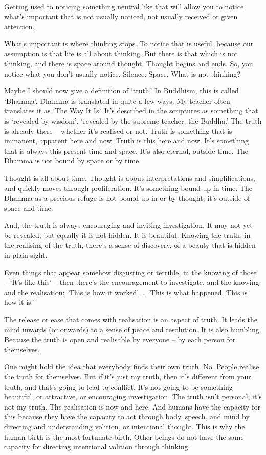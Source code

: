 Getting used to noticing something neutral like that will allow you to notice
what's important that is not usually noticed, not usually received or given
attention.

What's important is where thinking stops. To notice that is useful, because our
assumption is that life is all about thinking. But there is that which is not
thinking, and there is space around thought. Thought begins and ends. So, you
notice what you don't usually notice. Silence. Space. What is not thinking?

Maybe I should now give a definition of `truth.' In Buddhism, this is called
`Dhamma'. Dhamma is translated in quite a few ways. My teacher often translates
it as `The Way It Is'. It's described in the scriptures as something that is
`revealed by wisdom', `revealed by the supreme teacher, the Buddha.' The truth
is already there -- whether it's realised or not. Truth is something that is
immanent, apparent here and now. Truth is this here and now. It's something that is always this
present time and space. It's also eternal, outside time. The Dhamma is not bound by
space or by time.

Thought is all about time. Thought is about interpretations and simplifications,
and quickly moves through proliferation. It's something bound up in time. The
Dhamma as a precious refuge is not bound up in or by thought; it's outside of
space and time.

And, the truth is always encouraging and inviting investigation. It may not
yet be revealed, but equally it is not hidden. It is beautiful. Knowing
the truth, in the realising of the truth, there's a sense of discovery, of a
beauty that is hidden in plain sight.

Even things that appear somehow disgusting or terrible, in the knowing of those
-- `It's like this' -- then there's the encouragement to investigate, and the
knowing and the realisation: `This is how it worked' \ldots{} `This is what
happened. This is how it is.'

The release or ease that comes with realisation is an aspect of truth. It leads
the mind inwards (or onwards) to a sense of peace and resolution. It is also
humbling. Because the truth is open and realisable by everyone -- by each person for
themselves.

One might hold the idea that everybody finds their own truth. No. People realise
the truth for themselves. But if it's just my truth, then it's different from
your truth, and that's going to lead to conflict. It's not going to be something
beautiful, or attractive, or encouraging investigation. The truth isn't
personal; it's not my truth. The realisation is now and here. And humans have the
capacity for this because they have the capacity to act through body, speech, and
mind by directing and understanding volition, or intentional thought. This is
why the human birth is the most fortunate birth. Other beings do not have the
same capacity for directing intentional volition through thinking.

